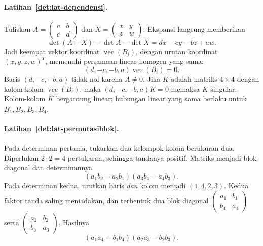       \paragraph{Latihan~\ref{det:lat-dependensi}.}
      Tuliskan $A=\left(\begin{smallmatrix}a&b\\c&d\end{smallmatrix}\right)$
      dan $X=\left(\begin{smallmatrix}x&y\\z&w\end{smallmatrix}\right)$.
      Ekspansi langsung memberikan
      \[
            \det(A+X)-\det A-\det X=dx-cy-bz+aw.
      \]
      Jadi keempat vektor koordinat $\operatorname{vec}(B_i)$, dengan urutan
      koordinat $(x,y,z,w)^T$, memenuhi persamaan linear homogen yang sama:
      \[
            (d,-c,-b,a)\operatorname{vec}(B_i)=0.
      \]
      Baris $(d,-c,-b,a)$ tidak nol karena $A\ne0$.
      Jika $K$ adalah matriks $4\times4$ dengan kolom-kolom
      $\operatorname{vec}(B_i)$, maka $(d,-c,-b,a)K=0$ memaksa $K$ singular.
      Kolom-kolom $K$ bergantung linear; hubungan linear yang sama berlaku
      untuk $B_1,B_2,B_3,B_4$.

      \paragraph{Latihan~\ref{det:lat-permutasiblok}.}
      Pada determinan pertama, tukarkan dua kelompok kolom berukuran dua.
      Diperlukan $2\cdot2=4$ pertukaran, sehingga tandanya positif.
      Matriks menjadi blok diagonal dan determinannya
      \[
            (a_1b_2-a_2b_1)(a_3b_4-a_4b_3).
      \]
      Pada determinan kedua, urutkan baris \emph{dan} kolom menjadi
      $(1,4,2,3)$. Kedua faktor tanda saling meniadakan, dan terbentuk dua
      blok diagonal
      $\left(\begin{smallmatrix}a_1&b_1\\b_4&a_4\end{smallmatrix}\right)$
      serta $\left(\begin{smallmatrix}a_2&b_2\\b_3&a_3\end{smallmatrix}\right)$.
      Hasilnya
      \[
            (a_1a_4-b_1b_4)(a_2a_3-b_2b_3).
      \]
\fi
